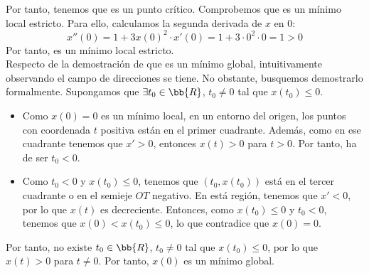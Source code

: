 \begin{ejercicio}
    Por tanto, tenemos que es un punto crítico. Comprobemos que es un mínimo local estricto. Para ello, calculamos la segunda derivada de $x$ en $0$:
    \begin{equation*}
        x''(0) = 1 + 3x(0)^2\cdot x'(0) = 1 + 3\cdot 0^2\cdot 0 = 1 > 0
    \end{equation*}
    Por tanto, es un mínimo local estricto.\\
    
    Respecto de la demostración de que es un mínimo global, intuitivamente observando el campo de direcciones se tiene.
    No obstante, busquemos demostrarlo formalmente. Supongamos que $\exists t_0\in \bb{R}$, $t_0\neq 0$ tal que $x(t_0)\leq 0$.
    \begin{itemize}
        \item Como $x(0)=0$ es un mínimo local, en un entorno del origen, los puntos con coordenada $t$ positiva están en el primer cuadrante. Además, como en ese cuadrante tenemos que
        $x'>0$, entonces $x(t)>0$ para $t>0$. Por tanto, ha de ser $t_0<0$.
        \item Como $t_0<0$ y $x(t_0)\leq 0$, tenemos que $(t_0, x(t_0))$ está en el tercer cuadrante o en el semieje $OT$ negativo. En está región, tenemos que $x'<0$, por lo que $x(t)$ es decreciente. Entonces, como $x(t_0)\leq 0$ y $t_0<0$, tenemos que $x(0)<x(t_0)\leq 0$, lo que contradice que $x(0)=0$.
    \end{itemize}
    Por tanto, no existe $t_0\in \bb{R}$, $t_0\neq 0$ tal que $x(t_0)\leq 0$, por lo que $x(t)>0$ para $t\neq 0$. Por tanto, $x(0)$ es un mínimo global.
\end{ejercicio}


